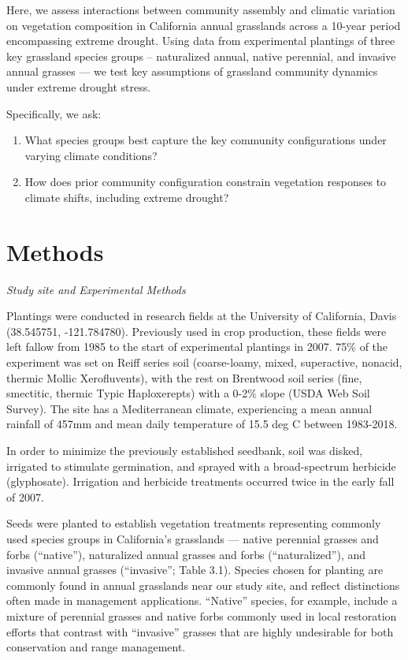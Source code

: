 \documentclass[twoside,12pt,final]{ucthesis-CA2012}
\begin{document}
\begin{ucmainmatter}
Here, we assess interactions between community assembly and climatic variation on vegetation composition in California annual grasslands across a 10-year period encompassing extreme drought.
Using data from experimental plantings of three key grassland species groups -- naturalized annual, native perennial, and invasive annual grasses --- we test key assumptions of grassland community dynamics under extreme drought stress.

Specifically, we ask:
\begin{enumerate}
\def\labelenumi{\arabic{enumi}.}
\item
  What species groups best capture the key community configurations under varying climate conditions?
\item
  How does prior community configuration constrain vegetation responses to climate shifts, including extreme drought?
\end{enumerate}
\hypertarget{methods}{%
\section{Methods}\label{methods}}

\emph{Study site and Experimental Methods}

Plantings were conducted in research fields at the University of California, Davis (38.545751, -121.784780).
Previously used in crop production, these fields were left fallow from 1985 to the start of experimental plantings in 2007.
75\% of the experiment was set on Reiff series soil (coarse-loamy, mixed, superactive, nonacid, thermic Mollic Xerofluvents), with the rest on Brentwood soil series (fine, smectitic, thermic Typic Haploxerepts) with a 0-2\% slope (USDA Web Soil Survey).
The site has a Mediterranean climate, experiencing a mean annual rainfall of 457mm and mean daily temperature of 15.5 deg C between 1983-2018.

In order to minimize the previously established seedbank, soil was disked, irrigated to stimulate germination, and sprayed with a broad-spectrum herbicide (glyphosate). Irrigation and herbicide treatments occurred twice in the early fall of 2007.

Seeds were planted to establish vegetation treatments representing commonly used species groups in California's grasslands --- native perennial grasses and forbs (``native''), naturalized annual grasses and forbs (``naturalized''), and invasive annual grasses (``invasive''; Table 3.1).
Species chosen for planting are commonly found in annual grasslands near our study site, and reflect distinctions often made in management applications.
``Native'' species, for example, include a mixture of perennial grasses and native forbs commonly used in local restoration efforts that contrast with ``invasive'' grasses that are highly undesirable for both conservation and range management.


\end{ucmainmatter}
\end{document}
